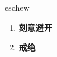
\begin{frame}
{\huge eschew}
\begin{center}
\begin{enumerate}\Large
  \item \textbf{刻意避开}
  \item \textbf{戒绝}
\end{enumerate}
\end{center}
\end{frame}
